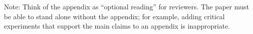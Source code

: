 \documentclass{article}
\begin{document}
Note: Think of the appendix as ``optional reading'' for reviewers. The paper must be able to stand alone without the appendix; for example, adding critical experiments that support the main claims to an appendix is inappropriate. 


\newpage

\end{document}
